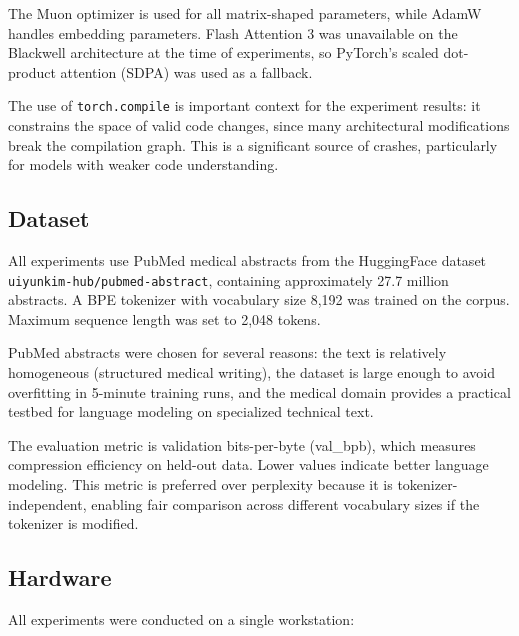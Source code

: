 \documentclass[11pt]{article}
\begin{document}
The Muon optimizer \citep{jordan2024muon} is used for all matrix-shaped parameters, while AdamW handles embedding parameters. Flash Attention 3 \citep{dao2024flashattention3} was unavailable on the Blackwell architecture at the time of experiments, so PyTorch's scaled dot-product attention (SDPA) was used as a fallback.

The use of \texttt{torch.compile} is important context for the experiment results: it constrains the space of valid code changes, since many architectural modifications break the compilation graph. This is a significant source of crashes, particularly for models with weaker code understanding.

\subsection{Dataset}
\label{sec:dataset}

All experiments use PubMed medical abstracts from the HuggingFace dataset \texttt{uiyunkim-hub/pubmed-abstract}, containing approximately 27.7 million abstracts. A BPE tokenizer with vocabulary size 8,192 was trained on the corpus. Maximum sequence length was set to 2,048 tokens.

PubMed abstracts were chosen for several reasons: the text is relatively homogeneous (structured medical writing), the dataset is large enough to avoid overfitting in 5-minute training runs, and the medical domain provides a practical testbed for language modeling on specialized technical text.

The evaluation metric is validation bits-per-byte (val\_bpb), which measures compression efficiency on held-out data. Lower values indicate better language modeling. This metric is preferred over perplexity because it is tokenizer-independent, enabling fair comparison across different vocabulary sizes if the tokenizer is modified.

\subsection{Hardware}
\label{sec:hardware}

All experiments were conducted on a single workstation:
\end{document}
